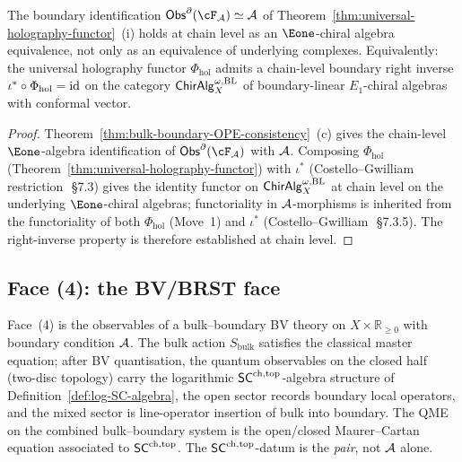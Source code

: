 \begin{corollary}
\label{cor:UHF-boundary-move-2-chain-level}
The boundary identification
$\Obs^\partial(\cF_\cA) \simeq \cA$ of
Theorem~\ref{thm:universal-holography-functor}~(i) holds at chain
level as an $\Eone$-chiral algebra equivalence, not only as an
equivalence of underlying complexes. Equivalently: the universal
holography functor $\Phi_{\mathrm{hol}}$ admits a chain-level
boundary right inverse $\iota^* \circ \Phi_{\mathrm{hol}} = \mathrm{id}$
on the category $\mathsf{ChirAlg}^{\omega,\mathrm{BL}}_X$ of
boundary-linear $E_1$-chiral algebras with conformal vector.
\end{corollary}

\begin{proof}
Theorem~\ref{thm:bulk-boundary-OPE-consistency}~(c) gives the
chain-level $\Eone$-algebra identification of
$\Obs^\partial(\cF_\cA)$ with $\mathcal{A}$. Composing
$\Phi_{\mathrm{hol}}$ (Theorem~\ref{thm:universal-holography-functor})
with $\iota^*$ (Costello--Gwilliam restriction~\cite{CG21}\,\S7.3)
gives the identity functor on $\mathsf{ChirAlg}^{\omega,\mathrm{BL}}_X$ at
chain level on the underlying $\Eone$-chiral algebras; functoriality
in $\mathcal{A}$-morphisms is inherited from the functoriality of both
$\Phi_{\mathrm{hol}}$ (Move~1) and $\iota^*$
(Costello--Gwilliam~\cite{CG21}\,\S7.3.5). The right-inverse
property is therefore established at chain level.
\end{proof}

\subsection{Face (4): the BV/BRST face}\label{subsec:face-bv-brst}

Face~(4) is the observables of a bulk--boundary BV theory on
$X\times\mathbb{R}_{\geq 0}$ with boundary condition $\mathcal{A}$. The bulk
action $S_{\mathrm{bulk}}$ satisfies the classical master equation;
after BV quantisation, the quantum observables on the closed half
(two-disc topology) carry the logarithmic
$\mathsf{SC}^{\mathrm{ch},\mathrm{top}}$-algebra structure of
Definition~\ref{def:log-SC-algebra}, the open sector records
boundary local operators, and the mixed sector is line-operator
insertion of bulk into boundary. The QME on the combined bulk--boundary
system is the open/closed Maurer--Cartan equation associated to
$\mathsf{SC}^{\mathrm{ch},\mathrm{top}}$. The $\mathsf{SC}^{\mathrm{ch},\mathrm{top}}$-datum is the \emph{pair}, not
$\mathcal{A}$ alone.

